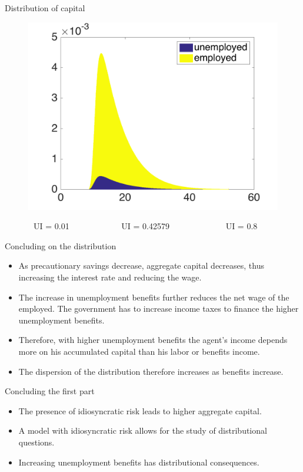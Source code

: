 \documentclass{beamer}
\begin{document}
\begin{frame}{Distribution of capital}
\begin{figure}[!tbp]
\begin{minipage}[b]{0.325\textwidth}
    \includegraphics[width=\textwidth]{distribution3}
  \end{minipage}
\end{figure}
\ \ \ \ \ \ \  UI = 0.01 \ \ \ \ \ \ \ \ \ \ \ \ UI = 0.42579 \ \ \ \ \ \ \ \ \ \ \ \ \ UI = 0.8
\end{frame}


\begin{frame}{Concluding on the distribution}

\begin{itemize} 


	\item {
As precautionary savings decrease, aggregate capital decreases, thus increasing the interest rate and reducing the wage. 
}
	\item {
The increase in unemployment benefits further reduces the net wage of the employed. The government has to increase income taxes to finance the higher unemployment benefits.
}
	\item {
Therefore, with higher unemployment benefits the agent's income depends more on his accumulated capital than his labor or benefits income. 
}
	\item {
The dispersion of the distribution therefore increases as benefits increase.
}


\end{itemize}

\end{frame}


\begin{frame}{Concluding the first part}
	
	\begin{itemize}
	
	\item {
The presence of idiosyncratic risk leads to higher aggregate capital. 
	}
		\item {
A model with idiosyncratic risk allows for the study of distributional questions.
	}	
	\item {
Increasing unemployment benefits has distributional consequences. 
	}	

	\end{itemize} 
\end{frame}
\end{document}
